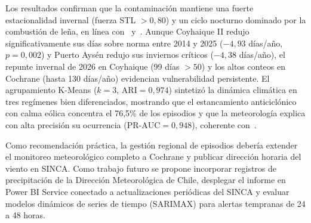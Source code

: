 \documentclass[conference]{IEEEtran}
\begin{document}
Los resultados confirman que la contaminaci{\'o}n mantiene una fuerte estacionalidad invernal (fuerza STL $>0,80$) y un ciclo nocturno dominado por la combusti{\'o}n de le{\~n}a, en l{\'i}nea con~\cite{molina2017} y~\cite{solis2022}. Aunque Coyhaique II redujo significativamente sus d{\'i}as sobre norma entre 2014 y 2025 ($-4,93$ d{\'i}as/a{\~n}o, $p=0,002$) y Puerto Ays{\'e}n redujo sus inviernos cr{\'i}ticos ($-4,38$ d{\'i}as/a{\~n}o), el repunte invernal de 2026 en Coyhaique (99 d{\'i}as $>50$) y los altos conteos en Cochrane (hasta 130 d{\'i}as/a{\~n}o) evidencian vulnerabilidad persistente. El agrupamiento K-Means ($k=3$, $\text{ARI}=0,974$) sintetiz{\'o} la din{\'a}mica clim{\'a}tica en tres reg{\'i}menes bien diferenciados, mostrando que el estancamiento anticicl{\'o}nico con calma e{\'o}lica concentra el 76,5\% de los episodios y que la meteorolog{\'i}a explica con alta precisi{\'o}n su ocurrencia ($\text{PR-AUC}=0,948$), coherente con~\cite{martinez2025}.

Como recomendaci{\'o}n pr{\'a}ctica, la gesti{\'o}n regional de episodios deber{\'i}a extender el monitoreo meteorol{\'o}gico completo a Cochrane y publicar direcci{\'o}n horaria del viento en SINCA. Como trabajo futuro se propone incorporar registros de precipitaci{\'o}n de la Direcci{\'o}n Meteorol{\'o}gica de Chile, desplegar el informe en Power BI Service conectado a actualizaciones peri{\'o}dicas del SINCA y evaluar modelos din{\'a}micos de series de tiempo (SARIMAX) para alertas tempranas de 24 a 48 horas.

\clearpage


\end{document}
